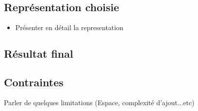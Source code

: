\subsection{Représentation choisie}
	\begin{itemize}
	\item Présenter en détail la representation
	\end{itemize}

\subsection{Résultat final}
\subsection{Contraintes}
Parler de quelques limitations (Espace, complexité d'ajout...etc)

				